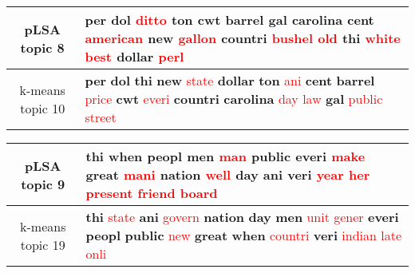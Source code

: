 \begin{center}\begin{tabularx}{\textwidth} {
  | c | >{\raggedright\arraybackslash}X | } \hline 
pLSA topic 8 & \textbf{per} \textbf{dol} \textcolor{red}{ditto} \textbf{ton} \textbf{cwt} \textbf{barrel} \textbf{gal} \textbf{carolina} \textbf{cent} \textcolor{red}{american} \textbf{new} \textcolor{red}{gallon} \textbf{countri} \textcolor{red}{bushel} \textcolor{red}{old} \textbf{thi} \textcolor{red}{white} \textcolor{red}{best} \textbf{dollar} \textcolor{red}{perl} \\ \hline 
k-means topic 10 & \textbf{per} \textbf{dol} \textbf{thi} \textbf{new} \textcolor{red}{state} \textbf{dollar} \textbf{ton} \textcolor{red}{ani} \textbf{cent} \textbf{barrel} \textcolor{red}{price} \textbf{cwt} \textcolor{red}{everi} \textbf{countri} \textbf{carolina} \textcolor{red}{day} \textcolor{red}{law} \textbf{gal} \textcolor{red}{public} \textcolor{red}{street} \\ \hline 
\end{tabularx}

\end{center}

\begin{center}\begin{tabularx}{\textwidth} {
  | c | >{\raggedright\arraybackslash}X | } \hline 
pLSA topic 9 & \textbf{thi} \textbf{when} \textbf{peopl} \textbf{men} \textcolor{red}{man} \textbf{public} \textbf{everi} \textcolor{red}{make} \textbf{great} \textcolor{red}{mani} \textbf{nation} \textcolor{red}{well} \textbf{day} \textbf{ani} \textbf{veri} \textcolor{red}{year} \textcolor{red}{her} \textcolor{red}{present} \textcolor{red}{friend} \textcolor{red}{board} \\ \hline 
k-means topic 19 & \textbf{thi} \textcolor{red}{state} \textbf{ani} \textcolor{red}{govern} \textbf{nation} \textbf{day} \textbf{men} \textcolor{red}{unit} \textcolor{red}{gener} \textbf{everi} \textbf{peopl} \textbf{public} \textcolor{red}{new} \textbf{great} \textbf{when} \textcolor{red}{countri} \textbf{veri} \textcolor{red}{indian} \textcolor{red}{late} \textcolor{red}{onli} \\ \hline 
\end{tabularx}

\end{center}

